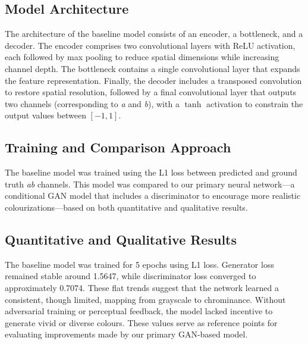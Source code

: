 \documentclass{article} %
\begin{document}
\subsection{Model Architecture}

The architecture of the baseline model consists of an encoder, a bottleneck, and a decoder. The encoder comprises two convolutional layers with ReLU activation, each followed by max pooling to reduce spatial dimensions while increasing channel depth. The bottleneck contains a single convolutional layer that expands the feature representation. Finally, the decoder includes a transposed convolution to restore spatial resolution, followed by a final convolutional layer that outputs two channels (corresponding to \textit{a} and \textit{b}), with a $\tanh$ activation to constrain the output values between $[-1, 1]$.

\subsection{Training and Comparison Approach}

The baseline model was trained using the L1 loss between predicted and ground truth \textit{ab} channels. This model was compared to our primary neural network---a conditional GAN model that includes a discriminator to encourage more realistic colourizations---based on both quantitative and qualitative results.

\subsection{Quantitative and Qualitative Results}

The baseline model was trained for 5 epochs using L1 loss. Generator loss remained stable around 1.5647, while discriminator loss converged to approximately 0.7074. These flat trends suggest that the network learned a consistent, though limited, mapping from grayscale to chrominance. Without adversarial training or perceptual feedback, the model lacked incentive to generate vivid or diverse colours. These values serve as reference points for evaluating improvements made by our primary GAN-based model.
\end{document}
